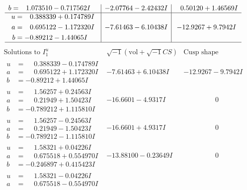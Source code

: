 \documentclass[1p]{elsarticle_modified}
\theoremstyle{definition}
\newcommand{\I}{\sqrt{-1}}
\begin{document}
$$\begin{array}{c|c|c}
\begin{aligned}
b &= \phantom{-}1.073510 - 0.717562 I\end{aligned}
 & -2.07764 - 2.42432 I & \phantom{-}0.50120 + 1.46569 I \\ \hline\begin{aligned}
u &= \phantom{-}0.388339 + 0.174789 I \\
a &= \phantom{-}0.695122 - 1.172320 I \\
b &= -0.89212 - 1.44065 I\end{aligned}
 & -7.61463 - 6.10438 I & -12.9267 + 9.7942 I\\
 \hline 
 \end{array}$$\newpage$$\begin{array}{c|c|c}  
\text{Solutions to }I^u_{1}& \I (\text{vol} + \sqrt{-1}CS) & \text{Cusp shape}\\
 \hline 
\begin{aligned}
u &= \phantom{-}0.388339 - 0.174789 I \\
a &= \phantom{-}0.695122 + 1.172320 I \\
b &= -0.89212 + 1.44065 I\end{aligned}
 & -7.61463 + 6.10438 I & -12.9267 - 9.7942 I \\ \hline\begin{aligned}
u &= \phantom{-}1.56257 + 0.24563 I \\
a &= \phantom{-}0.21949 + 1.50423 I \\
b &= -0.789212 + 1.115810 I\end{aligned}
 & -16.6601 - 4.9317 I & \phantom{-0.000000 } 0 \\ \hline\begin{aligned}
u &= \phantom{-}1.56257 - 0.24563 I \\
a &= \phantom{-}0.21949 - 1.50423 I \\
b &= -0.789212 - 1.115810 I\end{aligned}
 & -16.6601 + 4.9317 I & \phantom{-0.000000 } 0 \\ \hline\begin{aligned}
u &= \phantom{-}1.58321 + 0.04226 I \\
a &= \phantom{-}0.675518 + 0.554970 I \\
b &= -0.246897 + 0.415423 I\end{aligned}
 & -13.88100 - 0.23649 I & \phantom{-0.000000 } 0 \\ \hline\begin{aligned}
u &= \phantom{-}1.58321 - 0.04226 I \\
a &= \phantom{-}0.675518 - 0.554970 I \\

\end{aligned}
\end{array}$$
\end{document}
